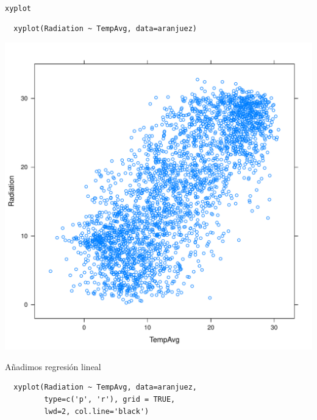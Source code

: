 \documentclass[xcolor={usenames,svgnames,dvipsnames}]{beamer}
\begin{document}
\begin{frame}[fragile,label=sec-6-1-2]{\texttt{xyplot}}
 \lstset{language=R,label= ,caption= ,numbers=none}
\begin{lstlisting}
  xyplot(Radiation ~ TempAvg, data=aranjuez)
\end{lstlisting}
\end{frame}

\begin{frame}[label=sec-6-1-3]{}
\includegraphics[width=.9\linewidth]{figs/xyplot.pdf}
\end{frame}



\begin{frame}[fragile,label=sec-6-1-4]{Añadimos regresión lineal}
 \lstset{language=R,label= ,caption= ,numbers=none}
\begin{lstlisting}
  xyplot(Radiation ~ TempAvg, data=aranjuez,
         type=c('p', 'r'), grid = TRUE,
         lwd=2, col.line='black')
\end{lstlisting}
\end{frame}
\end{document}
